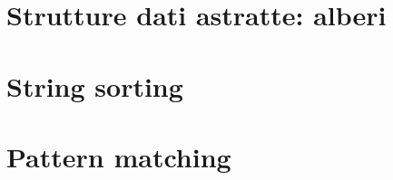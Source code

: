 \documentclass[italian, twoside]{../../../Resources/Utils/ClassNotes}
\begin{document}

\section{Strutture dati astratte: alberi}


\section{String sorting}


\section{Pattern matching}

\end{document}
